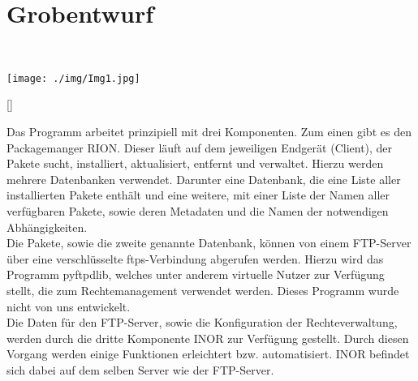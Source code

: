 \chapter{Grobentwurf}
\\[\intextsep]
\begin{minipage}{\linewidth}
\centering%
\texttt{[image: ./img/Img1.jpg]}%
\label{fig:Image 1}%
\end{minipage}
[\intextsep]

Das Programm arbeitet prinzipiell mit drei Komponenten. Zum einen gibt es den
Packagemanger RION. Dieser läuft auf dem jeweiligen Endgerät (Client), der Pakete sucht,
installiert, aktualisiert, entfernt und verwaltet. Hierzu werden mehrere Datenbanken
verwendet. Darunter eine Datenbank, die eine Liste aller installierten Pakete enthält und eine
weitere, mit einer Liste der Namen aller verfügbaren Pakete, sowie deren Metadaten und die
Namen der notwendigen Abhängigkeiten. \\


Die Pakete, sowie die zweite genannte Datenbank, können von einem FTP-Server über eine
verschlüsselte ftps-Verbindung abgerufen werden. Hierzu wird das Programm pyftpdlib,
welches unter anderem virtuelle Nutzer zur Verfügung stellt, die zum Rechtemanagement
verwendet werden. Dieses Programm wurde nicht von uns entwickelt.
\\

Die Daten für den FTP-Server, sowie die Konfiguration der Rechteverwaltung, werden durch
die dritte Komponente INOR zur Verfügung gestellt. Durch diesen Vorgang werden einige
Funktionen erleichtert bzw. automatisiert. INOR befindet sich dabei auf dem selben Server
wie der FTP-Server.\\   